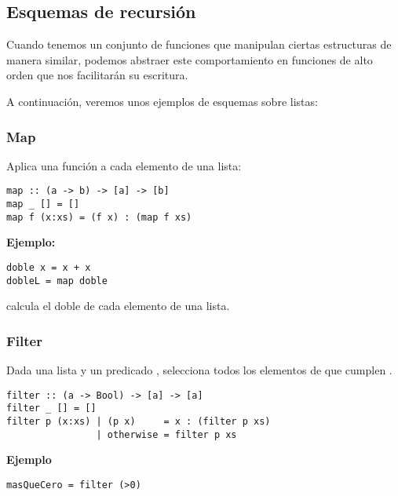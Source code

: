 \subsection{Esquemas de recursión} \label{sec:funcional.sub:esquemas_recursion}
Cuando tenemos un conjunto de funciones que manipulan ciertas estructuras de manera similar, podemos abstraer este comportamiento en funciones de alto orden que nos facilitarán su escritura.

A continuación, veremos unos ejemplos de esquemas sobre listas: 
\subsubsection{Map}
Aplica una función a cada elemento de una lista:
\begin{centrado}
	\begin{verbatim}
map :: (a -> b) -> [a] -> [b]
map _ [] = []
map f (x:xs) = (f x) : (map f xs)
	\end{verbatim}
\end{centrado} 

\textbf{Ejemplo:}
\begin{centrado}
	\begin{verbatim}
doble x = x + x
dobleL = map doble  
	\end{verbatim}
\end{centrado} 

 calcula el doble de cada elemento de una lista.

\subsubsection{Filter}
Dada una lista  y un predicado , selecciona todos los elementos de  que cumplen .

\begin{centrado}
	\begin{verbatim}
filter :: (a -> Bool) -> [a] -> [a]
filter _ [] = []
filter p (x:xs) | (p x)     = x : (filter p xs)
                | otherwise = filter p xs  
	\end{verbatim}
\end{centrado}

\textbf{Ejemplo}
\begin{centrado}
	\begin{verbatim}
masQueCero = filter (>0)
	\end{verbatim}
\end{centrado}

